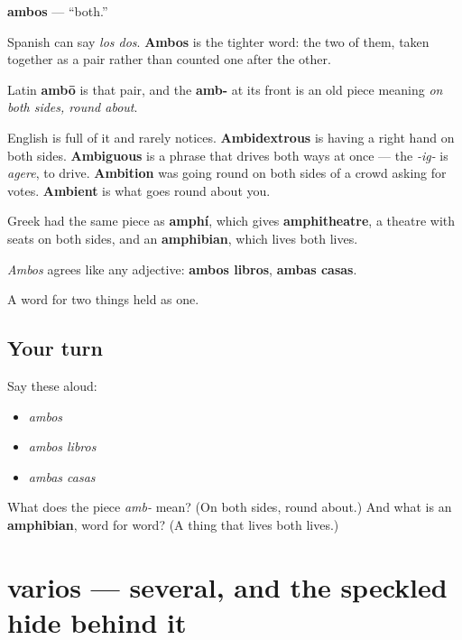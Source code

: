 \begin{cousinweb}
\textbf{ambos} — \textquotedblleft{}both.\textquotedblright{}

Spanish can say \emph{los dos}. \textbf{Ambos} is the tighter word: the two of them, taken together as a pair rather than counted one after the other.

Latin \textbf{ambō} is that pair, and the \textbf{amb-} at its front is an old piece meaning \emph{on both sides, round about}.

English is full of it and rarely notices. \textbf{Ambidextrous} is having a right hand on both sides. \textbf{Ambiguous} is a phrase that drives both ways at once — the \emph{-ig-} is \emph{agere}, to drive. \textbf{Ambition} was going round on both sides of a crowd asking for votes. \textbf{Ambient} is what goes round about you.

Greek had the same piece as \textbf{amphí}, which gives \textbf{amphitheatre}, a theatre with seats on both sides, and an \textbf{amphibian}, which lives both lives.

\emph{Ambos} agrees like any adjective: \textbf{ambos libros}, \textbf{ambas casas}.
\end{cousinweb}

\begin{grammarlens}[title={What you've built}]
A word for two things held as one.
\end{grammarlens}

\subsection*{Your turn}
Say these aloud:

\begin{itemize}
\raggedright
  \item \emph{ambos}
  \item \emph{ambos libros}
  \item \emph{ambas casas}
\end{itemize}

\begin{tcolorbox}[breakable,colback=teal!4,colframe=teal!35!black,title={Before you move on}]
What does the piece \emph{amb-} mean? (On both sides, round about.) And what is an \textbf{amphibian}, word for word? (A thing that lives both lives.)
\end{tcolorbox}
\section[varios]{varios — several, and the speckled hide behind it}

